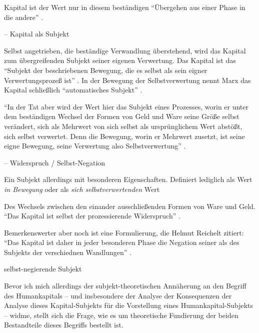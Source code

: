 \documentclass[12pt,
               DIV13,
               paper=a4,
               twoside=false,
               onehalfspacing,
               bibliography=totoc,
               toc=graduated,
               draft,
               ]{scrartcl}
\newcommand{\pc}[2]{\parencite[#1]{#2}}
\newcommand{\zn}[3]{\parencite[#1, zit. nach][#2]{#3}}
\newcommand{\worries}[1]{\ifdraft{\textcolor{blue}{\texttt{(#1)}}}{}}
\begin{document}
Kapital ist der Wert nur in diesem beständigen "`Übergehen aus einer
Phase in die andere"' \zn{Marx}{181}{reichelt}.




-- Kapital als Subjekt

Selbst angetrieben, die beständige Verwandlung überstehend, wird das
Kapital zum übergreifenden Subjekt seiner eigenen Verwertung. Das
Kapital ist das "`Subjekt der beschriebenen Bewegung, die es selbst
als sein eigner Verwertungsprozeß ist"' \zn{Marx}{181}{reichelt}. In
der Bewegung der Selbstverwertung nennt Marx das Kapital schließlich
"`automatisches Subjekt"' \pc{169}{kap}.

"`In der Tat aber wird der Wert hier das Subjekt eines Prozesses,
worin er unter dem beständigen Wechsel der Formen von Geld und Ware
seine Größe selbst verändert, sich als Mehrwert von sich selbst als
ursprünglichem Wert abstößt, sich selbst verwertet. Denn die Bewegung,
worin er Mehrwert zusetzt, ist seine eigne Bewegung, seine Verwertung
also Selbstverwertung"' \pc{169}{kap}.

-- Widerspruch / Selbst-Negation

Ein Subjekt allerdings mit besonderen Eigenschaften. Definiert
lediglich als Wert \emph{in Bewegung} oder als \emph{sich
selbstverwertenden} Wert

Des Wechsels zwischen den einander ausschließenden Formen von Ware und
Geld. "`Das Kapital ist selbst der prozessierende Widerspruch"'
\pc{601}{grundr}.

Bemerkenswerter aber noch ist eine Formulierung, die Helmut Reichelt
zitiert: "`Das Kapital ist daher in jeder besonderen Phase die
Negation seiner als des Subjekts der verschiednen Wandlungen"'
\zn{Marx}{181}{reichelt}.

selbst-negierende Subjekt

Bevor ich mich allerdings der subjekt-theoretischen Annäherung an den
Begriff des Humankapitals -- und insbesondere der Analyse der
Konsequenzen der Analyse dieses Kapital-Subjekts für die Vorstellung
eines Humankapital-Subjekts -- widme, stellt sich die Frage, wie es um
theoretische Fundierung der beiden Bestandteile dieses Begriffs
bestellt ist.
\end{document}
